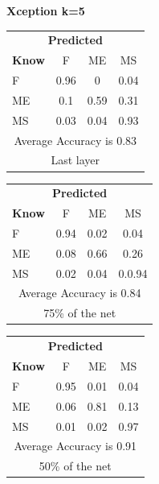 \documentclass[12pt]{article} %
\begin{document}
\begin{center}
\textbf{Xception k=5}
\end{center}
\begin{minipage}{0.5\textwidth}
\begin{center}
\begin{tabular}{l|c|c|c|}
 \multicolumn{4}{c}{ \textbf{ Predicted}}\\
 \textbf{Know}&F&ME&MS\\ \hline\hline
F   &0.96&0&0.04\\
ME &0.1&0.59&0.31\\
MS &0.03&0.04&0.93\\
\multicolumn{4}{c}{Average Accuracy is 0.83}\\
\multicolumn{4}{c}{Last layer}\\
\end{tabular}
\end{center}
\end{minipage}
\begin{minipage}{0.5\textwidth}
\begin{center}
\begin{tabular}{l|c|c|c|}
 \multicolumn{4}{c}{ \textbf{ Predicted}}\\
 \textbf{Know}&F&ME&MS\\ \hline\hline
F   &0.94&0.02&0.04\\
ME &0.08&0.66&0.26\\
MS &0.02&0.04&0.0.94\\
\multicolumn{4}{c}{Average Accuracy is 0.84}\\
\multicolumn{4}{c}{75\%  of the net}\\
\end{tabular}
\end{center}
\end{minipage}
\begin{minipage}{0.5\textwidth}
\begin{center}
\begin{tabular}{l|c|c|c|}
 \multicolumn{4}{c}{ \textbf{ Predicted}}\\
 \textbf{Know}&F&ME&MS\\ \hline\hline
F   &0.95&0.01&0.04\\
ME &0.06&0.81&0.13\\
MS &0.01&0.02&0.97\\
\multicolumn{4}{c}{Average Accuracy is 0.91}\\
\multicolumn{4}{c}{50\%  of the net}\\
\end{tabular}
\end{center}
\end{minipage}
\end{document}
